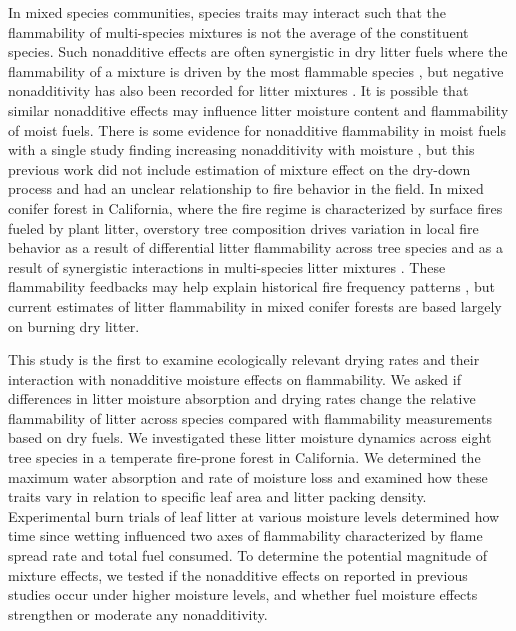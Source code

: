 \documentclass[letterpaper,12pt]{article}
\begin{document}
In mixed species communities, species traits may interact such that the
flammability of multi-species mixtures is not the average of the constituent
species. Such nonadditive effects are often synergistic in dry litter fuels
where the flammability of a mixture is driven by the most flammable species
\citep{VanAltena+Logtestjin+etal-2012, Magalhaes+Schwilk-2012}, but negative
nonadditivity has also been recorded for litter mixtures
\citep{Blauw+Wensink+etal-2015, Zhao+vanLogtestijn+etal-2019}. It is possible
that similar nonadditive effects may influence litter moisture content and
flammability of moist fuels. There is some evidence for nonadditive
flammability in moist fuels with a single study finding increasing
nonadditivity with moisture \citep{Blauw+Wensink+etal-2015}, but this previous
work did not include estimation of mixture effect on the dry-down process and
had an unclear relationship to fire behavior in the field. In mixed conifer
forest in California, where the fire regime is characterized by surface fires
fueled by plant litter, overstory tree composition drives variation in local
fire behavior \citep{Schwilk+Caprio-2011} as a result of differential litter
flammability across tree species and as a result of synergistic interactions in
multi-species litter mixtures \citep{Magalhaes+Schwilk-2012}. These
flammability feedbacks may help explain historical fire frequency patterns
\citep{Schwilk+Caprio-2011}, but current estimates of litter flammability in
mixed conifer forests are based largely on burning dry litter.

This study is the first to examine ecologically relevant drying rates and their
interaction with nonadditive moisture effects on flammability. We asked if
differences in litter moisture absorption and drying rates change the
relative flammability of litter across species compared with flammability
measurements based on dry fuels. We investigated these litter moisture dynamics
across eight tree species in a temperate fire-prone forest in California. We
determined the maximum water absorption and rate of moisture loss and examined
how these traits vary in relation to specific leaf area and litter packing
density. Experimental burn trials of leaf litter at various moisture levels
determined how time since wetting influenced two axes of flammability
characterized by flame spread rate and total fuel consumed. To determine the
potential magnitude of mixture effects, we tested if the nonadditive effects on
reported in previous studies occur under higher moisture levels, and whether
fuel moisture effects strengthen or moderate any nonadditivity.
\end{document}
